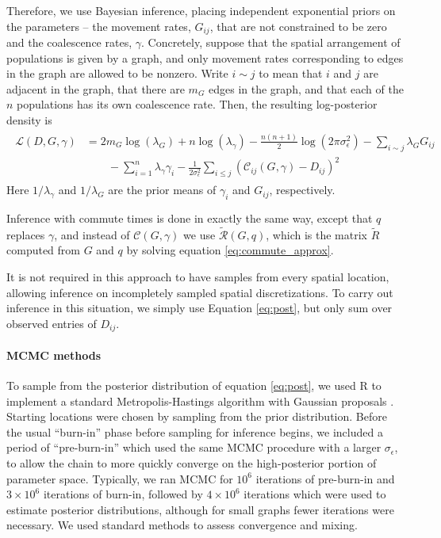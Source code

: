 \documentclass{article}
\newcommand{\comdist}{\widetilde{R}}
\newcommand{\comdistfn}{\widetilde{\mathcal{R}}}
\begin{document}
Therefore, we use Bayesian inference,
placing independent exponential priors on the parameters --
the movement rates, $G_{ij}$, that are not constrained to be zero
and the coalescence rates, $\gamma$.
Concretely, suppose that the spatial arrangement of populations is given by a graph,
and only movement rates corresponding to edges in the graph are allowed to be nonzero.
Write $i \sim j$ to mean that $i$ and $j$ are adjacent in the graph,
that there are $m_G$ edges in the graph,
and that each of the $n$ populations has its own coalescence rate.
Then, the resulting log-posterior density is
\begin{align} \label{eq:post}
    \begin{split}
\mathcal{L}(D, G, \gamma) 
    &=
    2 m_G \log(\lambda_G) + n \log(\lambda_\gamma) 
    - \frac{n(n+1)}{2} \log(2 \pi \sigma^2_\epsilon)
	- \sum_{i \sim j} \lambda_G G_{ij}  \\
    &\qquad
    -\sum_{i=1}^n \lambda_{\gamma}\gamma_i
		-\frac{1}{2 \sigma_{\epsilon}^2} \sum_{i \leq j} \left(
            \mathcal{C}_{ij}(G,\gamma) - D_{ij}
        \right)^2 
    \end{split}
\end{align}
Here $1/\lambda_\gamma$ and $1/\lambda_G$ are the prior means of $\gamma_i$ and $G_{ij}$,
respectively.

Inference with commute times is done in exactly the same way,
except that $q$ replaces $\gamma$,
and instead of $\mathcal{C}(G,\gamma)$ we use $\comdistfn(G, q)$,
which is the matrix $\comdist$ computed from $G$ and $q$ by solving equation \eqref{eq:commute_approx}.

It is not required in this approach to have samples from every spatial location,
allowing inference on incompletely sampled spatial discretizations.
To carry out inference in this situation,
we simply use Equation \ref{eq:post},
but only sum over observed entries of $D_{ij}$.

\paragraph{MCMC methods}
To sample from the posterior distribution of equation \eqref{eq:post}, 
we used R \citep{R} 
to implement a standard Metropolis-Hastings algorithm with Gaussian proposals \citep{brooks2011handbook}.
Starting locations were chosen by sampling from the prior distribution.
Before the usual ``burn-in'' phase before sampling for inference begins,
we included a period of ``pre-burn-in'' which used the same MCMC procedure
with a larger $\sigma_\epsilon$, to allow the chain to more quickly converge on the high-posterior
portion of parameter space.
Typically, we ran MCMC for $10^6$ iterations of pre-burn-in 
and $3 \times 10^6$ iterations of burn-in,
followed by $4 \times 10^6$ iterations which were used to estimate posterior distributions,
although for small graphs fewer iterations were necessary.
We used standard methods to assess convergence and mixing.
\end{document}
